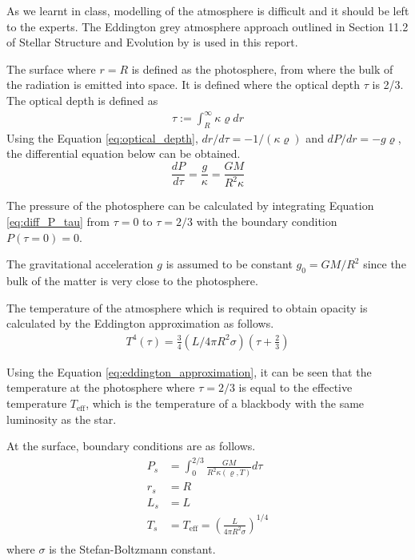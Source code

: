 \documentclass[twocolumn]{aastex631}
\begin{document}
As we learnt in class, modelling of the atmosphere is difficult and it should be left to the experts. The Eddington grey atmosphere approach outlined in Section 11.2 of Stellar Structure and Evolution by \cite{book:StellarStructureEvolution} is used in this report.

The surface where $r=R$ is defined as the photosphere, from where the bulk of the radiation is emitted into space. It is defined where the optical depth $\tau$ is 2/3. The optical depth is defined as
\begin{eqnarray}
	\tau:=\int_R^{\infty} \kappa \varrho d r
	\label{eq:optical_depth}
\end{eqnarray}
Using the Equation \ref{eq:optical_depth}, $d r / d \tau=-1 /(\kappa \varrho)$ and $d P / d r=-g \varrho$, the differential equation below can be obtained.
\begin{equation}
	\frac{d P}{d \tau}=\frac{g}{\kappa} = \frac{G M}{R^2 \kappa}
	\label{eq:diff_P_tau}
\end{equation}

The pressure of the photosphere can be calculated by integrating Equation \ref{eq:diff_P_tau} from $\tau = 0$ to $\tau = 2/3$ with the boundary condition $P(\tau = 0) = 0$.

The gravitational acceleration $g$ is assumed to be constant $g_0 = GM/R^2$ since the bulk of the matter is very close to the photosphere.

The temperature of the atmosphere which is required to obtain opacity is calculated by the Eddington approximation as follows.
\begin{eqnarray}
	T^4(\tau)=\frac{3}{4}\left(L / 4 \pi R^2 \sigma\right)\left(\tau+\frac{2}{3}\right)
	\label{eq:eddington_approximation}
\end{eqnarray}


Using the Equation \ref{eq:eddington_approximation}, it can be seen that the temperature at the photosphere where $\tau=2/3$ is equal to the effective temperature $T_{\mathrm{eff}}$, which is the temperature of a blackbody with the same luminosity as the star.

At the surface, boundary conditions are as follows.
\begin{equation}
	\begin{aligned}
		P_s & = \int_0^{2/3} \frac{G M}{R^2 \kappa(\varrho, T)} d \tau              \\
		r_s & = R                                                                   \\
		L_s & = L                                                                   \\
		T_s & = T_{\mathrm{eff}} = \left( \frac{L}{4 \pi R^2 \sigma} \right) ^{1/4} \\
	\end{aligned}
\end{equation}
where $\sigma$ is the Stefan-Boltzmann constant.
\end{document}
